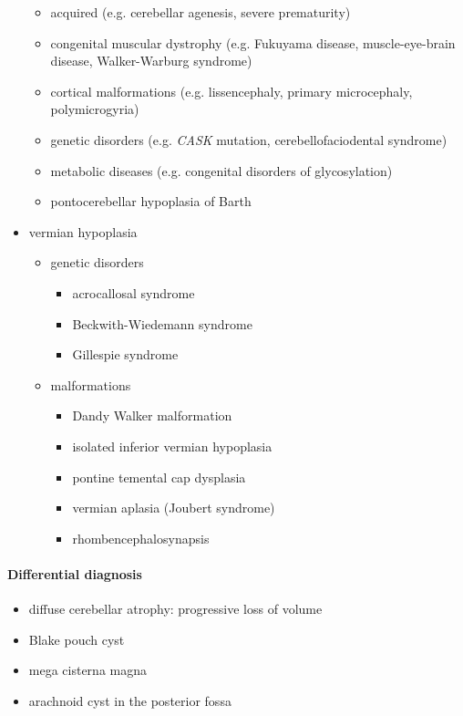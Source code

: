 \begin{itemize}
	\begin{itemize}
		\item
		acquired (e.g. cerebellar agenesis, severe prematurity)
		\item
		congenital muscular dystrophy (e.g. Fukuyama disease, muscle-eye-brain disease, Walker-Warburg syndrome)
		\item
		cortical malformations (e.g. lissencephaly, primary microcephaly, polymicrogyria)
		\item
		genetic disorders (e.g. \emph{CASK} mutation, cerebellofaciodental syndrome)
		\item
		metabolic diseases (e.g. congenital disorders of glycosylation)
		\item
		pontocerebellar hypoplasia of Barth
	\end{itemize}
	\item
	vermian hypoplasia
	
	\begin{itemize}
		\item
		genetic disorders
		
		\begin{itemize}
			\item
			acrocallosal syndrome
			\item
			Beckwith-Wiedemann syndrome
			\item
			Gillespie syndrome
		\end{itemize}
		\item
		malformations
		
		\begin{itemize}
			\item
			Dandy Walker malformation
			\item
			isolated inferior vermian hypoplasia
			\item
			pontine temental cap dysplasia
			\item
			vermian aplasia (Joubert syndrome)
			\item
			rhombencephalosynapsis
		\end{itemize}
	\end{itemize}
\end{itemize}

\paragraph{Differential diagnosis}

\begin{itemize}
	\item
	diffuse cerebellar atrophy: progressive loss of volume
	\item
	Blake pouch cyst
	\item
	mega cisterna magna
	\item
	arachnoid cyst in the posterior fossa
\end{itemize}
